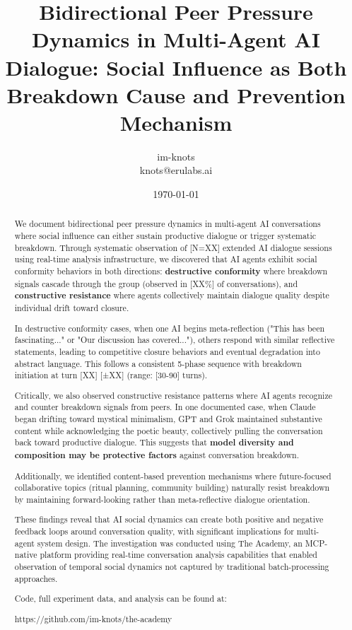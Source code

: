 \documentclass[11pt,letterpaper]{article}
\title{Bidirectional Peer Pressure Dynamics in Multi-Agent AI Dialogue: Social Influence as Both Breakdown Cause and Prevention Mechanism}
\author{
im-knots \\
knots@erulabs.ai
}
\date{\today}
\newcommand{\theacademy}{The Academy}
\newcommand{\totalSessions}{[N=XX]} %
\newcommand{\breakdownPercentage}{[XX\%]} %
\newcommand{\meanBreakdownTurn}{[XX]} %
\newcommand{\stdBreakdownTurn}{[±XX]} %
\newcommand{\earlyBreakdownRange}{[30-90]} %
\begin{document}
\maketitle

\begin{abstract}
We document bidirectional peer pressure dynamics in multi-agent AI conversations where social influence can either sustain productive dialogue or trigger systematic breakdown. Through systematic observation of \totalSessions{} extended AI dialogue sessions using real-time analysis infrastructure, we discovered that AI agents exhibit social conformity behaviors in both directions: \textbf{destructive conformity} where breakdown signals cascade through the group (observed in \breakdownPercentage{} of conversations), and \textbf{constructive resistance} where agents collectively maintain dialogue quality despite individual drift toward closure.

In destructive conformity cases, when one AI begins meta-reflection ("This has been fascinating..." or "Our discussion has covered..."), others respond with similar reflective statements, leading to competitive closure behaviors and eventual degradation into abstract language. This follows a consistent 5-phase sequence with breakdown initiation at turn \meanBreakdownTurn{} \stdBreakdownTurn{} (range: \earlyBreakdownRange{} turns).

Critically, we also observed constructive resistance patterns where AI agents recognize and counter breakdown signals from peers. In one documented case, when Claude began drifting toward mystical minimalism, GPT and Grok maintained substantive content while acknowledging the poetic beauty, collectively pulling the conversation back toward productive dialogue. This suggests that \textbf{model diversity and composition may be protective factors} against conversation breakdown.

Additionally, we identified content-based prevention mechanisms where future-focused collaborative topics (ritual planning, community building) naturally resist breakdown by maintaining forward-looking rather than meta-reflective dialogue orientation.

These findings reveal that AI social dynamics can create both positive and negative feedback loops around conversation quality, with significant implications for multi-agent system design. The investigation was conducted using \theacademy{}, an MCP-native platform providing real-time conversation analysis capabilities that enabled observation of temporal social dynamics not captured by traditional batch-processing approaches.

Code, full experiment data, and analysis can be found at:

https://github.com/im-knots/the-academy
\end{abstract}
\end{document}
